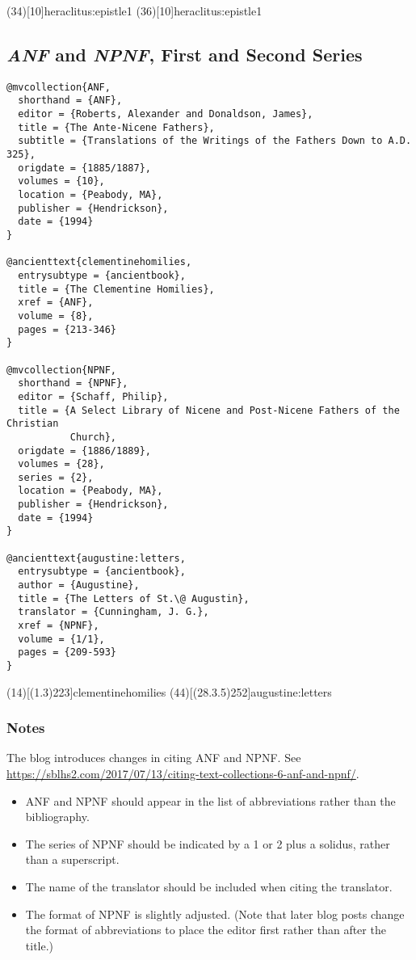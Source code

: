 \documentclass[a4paper]{article}
\begin{document}
\examplecite(34)[10]{heraclitus:epistle1}
\examplecite[atrans](36)[10]{heraclitus:epistle1}
\begin{verbcite}
  \nocite{malherbe:1977}
\end{verbcite}
\exampleabbreviations
\examplebibliography

\subsection{\emph{ANF} and \emph{NPNF}, First and Second Series}

\begin{verbatim}
@mvcollection{ANF,
  shorthand = {ANF},
  editor = {Roberts, Alexander and Donaldson, James},
  title = {The Ante-Nicene Fathers},
  subtitle = {Translations of the Writings of the Fathers Down to A.D. 325},
  origdate = {1885/1887},
  volumes = {10},
  location = {Peabody, MA},
  publisher = {Hendrickson},
  date = {1994}
}

@ancienttext{clementinehomilies,
  entrysubtype = {ancientbook},
  title = {The Clementine Homilies},
  xref = {ANF},
  volume = {8},
  pages = {213-346}
}

@mvcollection{NPNF,
  shorthand = {NPNF},
  editor = {Schaff, Philip},
  title = {A Select Library of Nicene and Post-Nicene Fathers of the Christian
           Church},
  origdate = {1886/1889},
  volumes = {28},
  series = {2},
  location = {Peabody, MA},
  publisher = {Hendrickson},
  date = {1994}
}

@ancienttext{augustine:letters,
  entrysubtype = {ancientbook},
  author = {Augustine},
  title = {The Letters of St.\@ Augustin},
  translator = {Cunningham, J. G.},
  xref = {NPNF},
  volume = {1/1},
  pages = {209-593}
}
\end{verbatim}

\examplecite(14)[(1.3)223]{clementinehomilies}
\examplecite[atrans](44)[(28.3.5)252]{augustine:letters}
\exampleabbreviations

\subsubsection{Notes}

The blog introduces changes in citing ANF and NPNF. See
\url{https://sblhs2.com/2017/07/13/citing-text-collections-6-anf-and-npnf/}.

\begin{itemize}
  \item ANF and NPNF should appear in the list of abbreviations rather than
    the bibliography.
  \item The series of NPNF should be indicated by a 1 or 2 plus a solidus,
    rather than a superscript.
  \item The name of the translator should be included when citing the
    translator.
  \item The format of NPNF is slightly adjusted. (Note that later blog posts
    change the format of abbreviations to place the editor first rather than
    after the title.)
\end{itemize}
\end{document}
